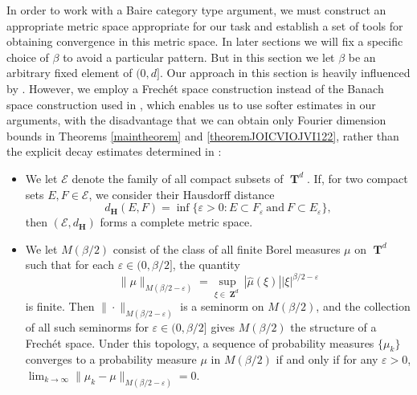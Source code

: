 \documentclass[dvipsnames,letterpaper,12pt]{article}
\numberwithin{equation}{section}
\DeclareMathOperator{\ZZ}{\mathbf{Z}}
\DeclareMathOperator{\TT}{\mathbf{T}}
\numberwithin{theorem}{section}
\begin{document}
In order to work with a Baire category type argument, we must construct an appropriate metric space appropriate for our task and establish a set of tools for obtaining convergence in this metric space. In later sections we will fix a specific choice of $\beta$ to avoid a particular pattern. But in this section we let $\beta$ be an arbitrary fixed element of $(0,d]$. Our approach in this section is heavily influenced by \cite{Korner2}. However, we employ a Frech\'{e}t space construction instead of the Banach space construction used in \cite{Korner2}, which enables us to use softer estimates in our arguments, with the disadvantage that we can obtain only Fourier dimension bounds in Theorems \ref{maintheorem} and \ref{theoremJOICVIOJVI122}, rather than the explicit decay estimates determined in \cite{Korner2}:
%
\begin{itemize}
    \item We let $\mathcal{E}$ denote the family of all compact subsets of $\TT^d$. If, for two compact sets $E,F \in \mathcal{E}$, we consider their Hausdorff distance
    \[ d_\mathbf{H}(E,F) = \inf \{ \varepsilon > 0 : E \subset F_\varepsilon\ \text{and}\ F \subset E_\varepsilon \}, \]
    then $(\mathcal{E},d_\mathbf{H})$ forms a complete metric space. %

    \item We let $M(\beta/2)$ consist of the class of all finite Borel measures $\mu$ on $\TT^d$ such that for each $\varepsilon \in (0,\beta/2]$, the quantity
    \[ \| \mu \|_{M(\beta/2 - \varepsilon)} = \sup_{\xi \in \ZZ^d} |\widehat{\mu}(\xi)| |\xi|^{\beta/2 - \varepsilon} \]
    is finite. Then $\| \cdot \|_{M(\beta/2 - \varepsilon)}$ is a seminorm on $M(\beta/2)$, and the collection of all such seminorms for $\varepsilon \in (0,\beta/2]$ gives $M(\beta/2)$ the structure of a Frech\'{e}t space. Under this topology, a sequence of probability measures $\{ \mu_k \}$ converges to a probability measure $\mu$ in $M(\beta/2)$ if and only if for any $\varepsilon > 0$, $\lim_{k \to \infty} \| \mu_k - \mu \|_{M(\beta/2 - \varepsilon)} = 0$.
\end{itemize}
\end{document}
